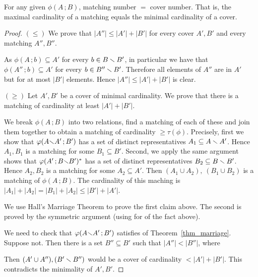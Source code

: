 \documentclass[scombinatorics.tex]{subfiles}
\begin{document}
\begin{void_thm}
   For any given  $\phi(A\,;B)$, matching number $=$ cover number.
   That is, the maximal cardinality of a matching equals the minimal cardinality of a cover.
\end{void_thm}

\begin{proof}
   $(\le)$ 
   We prove that $|A''|\le|A'|+|B'|$ for every cover $A',B'$ and every matching $A'',B''$.

   As  $\phi(A\,;b)\subseteq A'$ for every $b\in B\smallsetminus B'$, in particular we have that $\phi(A''\,;b)\subseteq A'$ for every $b\in B''\smallsetminus B'$.
   Therefore all elements of $A''$ are in $A'$ but for at most $|B'|$ elements. 
   Hence $|A''|\le|A'|+|B'|$ is clear.


   $(\ge)$ 
   Let $A',B'$ be a cover of minimal cardinality. 
   We prove that there is a matching of cardinality at least $|A'|+|B'|$.

   We break $\phi(A\,;B)$ into two relations, find a matching of each of these and join them together to obtain a matching of cardinality $\ge\tau(\phi)$.
   Precisely, first we show that $\varphi(A{\smallsetminus} A'\,;B')$ has a set of distinct representatives $A_1\subseteq A\smallsetminus A'$.
   Hence $A_1,B_1$ is a matching for some $B_1\subseteq B'$.
   Second, we apply the same argument shows that $\varphi(A'\,;B{\smallsetminus} B')^*$ has a  set of distinct representatives $B_2\subseteq B\smallsetminus B'$.
   Hence $A_2,B_2$ is a matching for some $A_2\subseteq A'$.
   Then $(A_1\cup A_2),\ (B_1\cup B_2)$ is a matching of  $\phi(A\,;B)$.
   The cardinality of this maching is $|A_1|+|A_2|=|B_1|+|A_2|\le|B'|+|A'|$.
   
   We use Hall's Marriage Theorem to prove the first claim above.
   The second is proved by the symmetric argument (using  for  of the fact above). 

   We need to check that $\varphi(A{\smallsetminus} A'\,;B')$ satisfies  of Theorem~\ref{thm_marriage}.
   Suppose not. Then there is a set $B''\subseteq B'$ such that $|A''|<|B''|$, where


   Then $(A'\cup A''), (B'\smallsetminus B'')$ would be a cover of cardinality $<|A'|+|B'|$.
   This contradicts the minimality of $A',B'$.
\end{proof}



\end{document}
